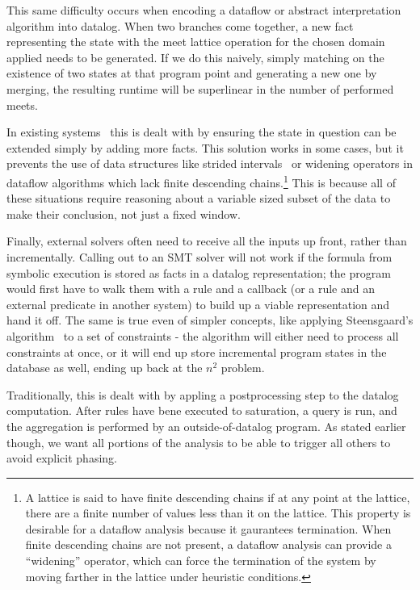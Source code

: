 This same difficulty occurs when encoding a dataflow or abstract interpretation algorithm into datalog.
When two branches come together, a new fact representing the state with the meet lattice operation for the chosen domain applied needs to be generated.
If we do this naively, simply matching on the existence of two states at that program point and generating a new one by merging, the resulting runtime will be superlinear in the number of performed meets.

In existing systems~\cite{doop1} this is dealt with by ensuring the state in question can be extended simply by adding more facts.
This solution works in some cases, but it prevents the use of data structures like strided intervals~\cite{vsa} or widening operators in dataflow algorithms which lack finite descending chains.\footnote{
A lattice is said to have finite descending chains if at any point at the lattice, there are a finite number of values less than it on the lattice.
This property is desirable for a dataflow analysis because it gaurantees termination.
When finite descending chains are not present, a dataflow analysis can provide a ``widening'' operator, which can force the termination of the system by moving farther in the lattice under heuristic conditions.
}
This is because all of these situations require reasoning about a variable sized subset of the data to make their conclusion, not just a fixed window.

Finally, external solvers often need to receive all the inputs up front, rather than incrementally.
Calling out to an SMT solver will not work if the formula from symbolic execution is stored as facts in a datalog representation; the program would first have to walk them with a rule and a callback (or a rule and an external predicate in another system) to build up a viable representation and hand it off.
The same is true even of simpler concepts, like applying Steensgaard's algorithm~\cite{steensgaard-alias} to a set of constraints - the algorithm will either need to process all constraints at once, or it will end up store incremental program states in the database as well, ending up back at the $n^2$ problem.

Traditionally, this is dealt with by appling a postprocessing step to the datalog computation.
After rules have bene executed to saturation, a query is run, and the aggregation is performed by an outside-of-datalog program.
As stated earlier though, we want all portions of the analysis to be able to trigger all others to avoid explicit phasing.

